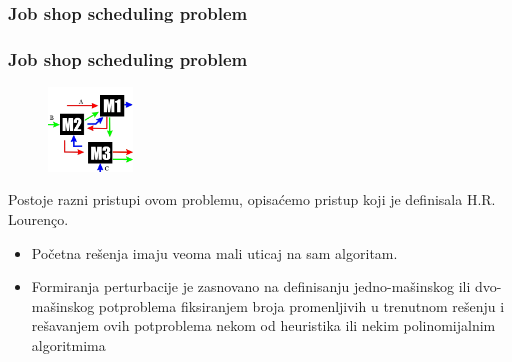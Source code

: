 \documentclass{beamer}
\begin{document}
\subsubsection{Job shop scheduling problem}
\begin{frame}[fragile]\frametitle{Job shop scheduling problem}
\begin{figure}[h!]
  \centering
  \includegraphics[width=0.2\textwidth]{jobshop.png}
  \label{figure:jssp}
\end{figure}
Postoje razni pristupi ovom problemu, opisaćemo pristup koji je definisala H.R. Lourenço.
\begin{itemize}
  \item Početna rešenja imaju veoma mali uticaj na sam algoritam.
  \item Formiranja perturbacije je zasnovano na definisanju jedno-mašinskog ili dvo-mašinskog potproblema fiksiranjem broja promenljivih u trenutnom rešenju i rešavanjem ovih potproblema nekom od heuristika ili nekim polinomijalnim algoritmima
\end{itemize}
\end{frame}
\end{document}
